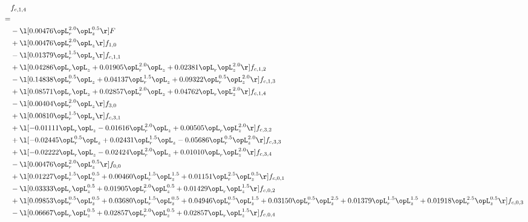 \begin{alignat}{2} 
\label{eq:f_14_1} 
& f_{c,1,4} \nonumber \\ 
 = \\ 
& - \l[  0.00476 \opL_r^{2.0} \opL_z^{0.5}  \r] F \nonumber \\ 
& + \l[  0.00476 \opL_r^{2.0} \opL_z  \r] f_{1,0} \nonumber \\ 
& - \l[  0.01379 \opL_r^{1.5} \opL_z  \r] f_{c,1,1} \nonumber \\ 
& + \l[  0.04286 \opL_r \opL_z +  0.01905 \opL_r^{2.0} \opL_z +  0.02381 \opL_r \opL_z^{2.0}  \r] f_{c,1,2} \nonumber \\ 
& - \l[  0.14838 \opL_r^{0.5} \opL_z +  0.04137 \opL_r^{1.5} \opL_z +  0.09322 \opL_r^{0.5} \opL_z^{2.0}  \r] f_{c,1,3} \nonumber \\ 
& + \l[  0.08571 \opL_r \opL_z +  0.02857 \opL_r^{2.0} \opL_z +  0.04762 \opL_r \opL_z^{2.0}  \r] f_{c,1,4} \nonumber \\ 
& - \l[  0.00404 \opL_r^{2.0} \opL_z  \r] f_{3,0} \nonumber \\ 
& + \l[  0.00810 \opL_r^{1.5} \opL_z  \r] f_{c,3,1} \nonumber \\ 
& + \l[  -0.01111 \opL_r \opL_z   -0.01616 \opL_r^{2.0} \opL_z +  0.00505 \opL_r \opL_z^{2.0}  \r] f_{c,3,2} \nonumber \\ 
& + \l[  -0.02445 \opL_r^{0.5} \opL_z +  0.02431 \opL_r^{1.5} \opL_z   -0.05686 \opL_r^{0.5} \opL_z^{2.0}  \r] f_{c,3,3} \nonumber \\ 
& + \l[  -0.02222 \opL_r \opL_z   -0.02424 \opL_r^{2.0} \opL_z +  0.01010 \opL_r \opL_z^{2.0}  \r] f_{c,3,4} \nonumber \\ 
& - \l[  0.00476 \opL_r^{2.0} \opL_z^{0.5}  \r] f_{0,0} \nonumber \\ 
& + \l[  0.01227 \opL_r^{1.5} \opL_z^{0.5} +  0.00460 \opL_r^{1.5} \opL_z^{1.5} +  0.01151 \opL_r^{2.5} \opL_z^{0.5}  \r] f_{c,0,1} \nonumber \\ 
& - \l[  0.03333 \opL_r \opL_z^{0.5} +  0.01905 \opL_r^{2.0} \opL_z^{0.5} +  0.01429 \opL_r \opL_z^{1.5}  \r] f_{c,0,2} \nonumber \\ 
& + \l[  0.09853 \opL_r^{0.5} \opL_z^{0.5} +  0.03680 \opL_r^{1.5} \opL_z^{0.5} +  0.04946 \opL_r^{0.5} \opL_z^{1.5} +  0.03150 \opL_r^{0.5} \opL_z^{2.5} +  0.01379 \opL_r^{1.5} \opL_z^{1.5} +  0.01918 \opL_r^{2.5} \opL_z^{0.5}  \r] f_{c,0,3} \nonumber \\ 
& - \l[  0.06667 \opL_r \opL_z^{0.5} +  0.02857 \opL_r^{2.0} \opL_z^{0.5} +  0.02857 \opL_r \opL_z^{1.5}  \r] f_{c,0,4} \nonumber \\ 

\end{alignat}
